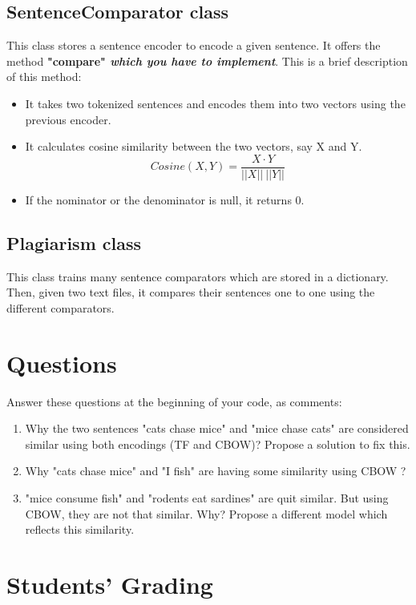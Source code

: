 \documentclass[11pt, a4paper]{article}
\begin{document}
\subsection{SentenceComparator class}

This class stores a sentence encoder to encode a given sentence. 
It offers the method \textbf{"compare" \textit{\color{red}which you have to implement}}.
This is a brief description of this method:
\begin{itemize}
	\item It takes two tokenized sentences and encodes them into two vectors using the previous encoder.
	\item It calculates cosine similarity between the two vectors, say X and Y.
	\[Cosine(X, Y) = \frac{X \cdot Y}{||X||\ ||Y||}\] 
	\item If the nominator or the denominator is null, it returns 0.
\end{itemize}

\subsection{Plagiarism class}

This class trains many sentence comparators which are stored in a dictionary.
Then, given two text files, it compares their sentences one to one using the different comparators.

\section{Questions}

Answer these questions at the beginning of your code, as comments:
\begin{enumerate}
	\item Why the two sentences "cats chase mice" and "mice chase cats" are considered similar 
	using both encodings (TF and CBOW)?
	Propose a solution to fix this.
	
	\item Why "cats chase mice" and "I fish" are having some similarity using CBOW ?
	
	\item "mice consume fish" and "rodents eat sardines" are quit similar.
	But using CBOW, they are not that similar.
	Why?
	Propose a different model which reflects this similarity.
	
\end{enumerate}


\section{Students' Grading}
\end{document}

